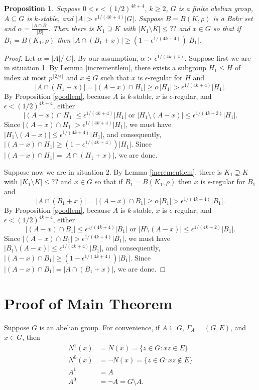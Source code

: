 \documentclass[11pt]{article}
\newtheorem{proposition}{Proposition}
\theoremstyle{definition}
\begin{document}
\begin{proposition}\label{keylem}
Suppose $0<\epsilon<(1/2)^{4k+4}$, $k\geq 2$, $G$ is a finite abelian group, $A\subseteq G$ is $k$-stable, and $|A|>\epsilon^{1/(4k+4)}|G|$.  Suppose $B=B(K,\rho)$ is a Bohr set and $\alpha=\frac{|A\cap B|}{|B|}$.  Then there is $K_1\supseteq K$ with $|K_1\setminus K|\leq ??$ and $x\in G$ so that if $B_1=B(K_1,\rho)$ then $|A\cap (B_1+x)|\geq (1-\epsilon^{1/(4k+4)})|B_1|$.
\end{proposition}

\begin{proof}
Let $\alpha= |A|/|G|$.  By our assumption, $\alpha>\epsilon^{1/(4k+4)}$.  Suppose first we are in situation 1. By Lemma \ref{incrementlem}, there exists a subgroup $H_1\leq H$ of index at most $p^{\lfloor 2/\epsilon\rfloor }$ and $x\in G$ such that $x$ is $\epsilon$-regular for $H$ and 
$$
|A\cap (H_1+x)|=|(A-x)\cap H_1|\geq \alpha|H_1|>\epsilon^{1/(4k+4)}|H_1|.
$$
By Proposition \ref{goodlem}, because $A$ is $k$-stable, $x$ is $\epsilon$-regular, and $\epsilon<(1/2)^{4k+4}$, either 
$$
|(A-x)\cap H_1|\leq \epsilon^{1/(4k+4)}|H_1|\text{ or }|H_1\setminus (A-x)|\leq \epsilon^{1/(4k+2)}|H_1|.
$$
Since $|(A-x)\cap H_1| >\epsilon^{1/(4k+4)}|H_1|$, we must have $|H_1\setminus (A-x)|\leq \epsilon^{1/(4k+4)}|H_1|$, and consequently, $|(A-x)\cap H_1|\geq (1-\epsilon^{1/(4k+4)})|H_1|$.  Since $|(A-x)\cap H_1|=|A\cap (H_1+x)|$, we are done.


Suppose now we are in situation 2. By Lemma \ref{incrementlem}, there is $K_1\supseteq K$ with $|K_1\setminus K|\leq ??$ and $x\in G$ so that if $B_1=B(K_1,\rho)$ then $x$ is $\epsilon$-regular for $B_1$ and 
$$
|A\cap (B_1+x)|=|(A-x)\cap B_1|\geq \alpha|B_1|>\epsilon^{1/(4k+4)}|B_1|.
$$
By Proposition \ref{goodlem}, because $A$ is $k$-stable, $x$ is $\epsilon$-regular, and $\epsilon<(1/2)^{4k+4}$, either 
$$
|(A-x)\cap B_1|\leq \epsilon^{1/(4k+4)}|B_1|\text{ or }|H\setminus (A-x)|\leq \epsilon^{1/(4k+2)}|B_1|.
$$
Since $|(A-x)\cap B_1| >\epsilon^{1/(4k+4)}|B_1|$, we must have $|B_1\setminus (A-x)|\leq \epsilon^{1/(4k+4)}|B_1|$, and consequently, $|(A-x)\cap B_1|\geq (1-\epsilon^{1/(4k+4)})|B_1|$.  Since $|(A-x)\cap B_1|=|A\cap (B_1+x)|$, we are done.
\end{proof}



\section{Proof of Main Theorem}
Suppose $G$ is an abelian group. For convenience, if $A\subseteq G$, $\Gamma_A=(G,E)$, and $x\in G$, then 
\begin{align*}
N^1(x)&=N(x)=\{z\in G: xz\in E\}\\
N^0(x)&=\neg N(x)=\{z\in G: xz\notin E\}\\
A^1&=A\\
A^0&=\neg A=G\setminus A.
\end{align*}
\end{document}
